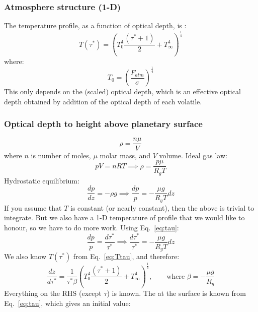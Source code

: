 \subsubsection{Atmosphere structure (1-D)}
The temperature profile, as a function of optical depth, is \citep[Eq.~A15,][]{AM85}:
\begin{equation}
T(\tau^\ast) = \left( T_0^4 \frac{(\tau^\ast+1)}{2} +T_\infty^4 \right)^\frac{1}{4}
\label{eq:Ttau}
\end{equation}
where:
\begin{equation}
T_0 = \left( \frac{F_{atm}}{\sigma} \right)^\frac{1}{4}
\end{equation}
This only depends on the (scaled) optical depth, which is an effective optical depth obtained by addition of the optical depth of each volatile.

\subsubsection{Optical depth to height above planetary surface}
\begin{equation}
\rho = \frac{n \mu}{V}
\end{equation}
where $n$ is number of moles, $\mu$ molar mass, and $V$ volume. Ideal gas law:
\begin{equation}
pV = nRT \implies \rho = \frac{p \mu}{R_g T}
\end{equation}
Hydrostatic equilibrium:
\begin{equation}
\frac{dp}{dz} = - \rho g \implies \frac{dp}{p} = -\frac{\mu g}{R_g T}dz
\end{equation}
If you assume that $T$ is constant (or nearly constant), then the above is trivial to integrate.  But we also have a 1-D temperature of profile that we would like to honour, so we have to do more work.  Using Eq.~\ref{eq:tau}:
\begin{equation}
\frac{dp}{p} = \frac{d \tau^\ast}{\tau^\ast} \implies \frac{d \tau^\ast}{\tau^\ast} = -\frac{\mu g}{R_g T}dz
\end{equation}
We also know $T(\tau^\ast)$ from Eq.~\ref{eq:Ttau}, and therefore:
\begin{equation}
\frac{dz}{d\tau^\ast} = \frac{1}{\tau^\ast \beta} \left( T_0^4 \frac{(\tau^\ast+1)}{2} +T_\infty^4 \right)^\frac{1}{4}, \qquad \text{where } \beta = -\frac{\mu g}{R_g}
\label{eq:dzdtau}
\end{equation}
Everything on the RHS (except $\tau$) is known.  The  at the surface is known from Eq.~\ref{eq:tau}, which gives an initial value:

